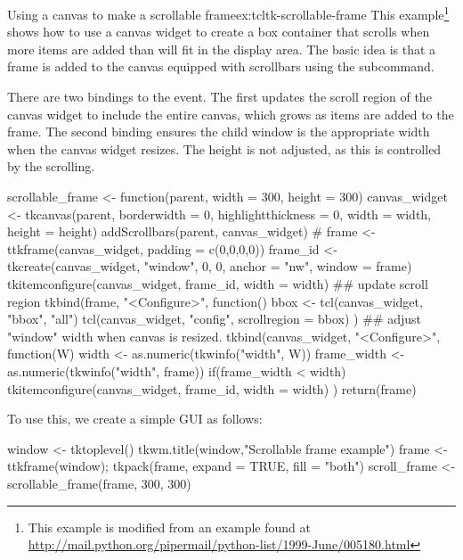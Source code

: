 \begin{example}{Using a canvas to make a scrollable frame}{ex:tcltk-scrollable-frame}
This example\footnote{This example is modified from an example found
  at \url{
    http://mail.python.org/pipermail/python-list/1999-June/005180.html}}
shows how to use a canvas widget to create a box container that
scrolls when more items are added than will fit in the display
area. The basic idea is that a frame is added to the canvas equipped
with scrollbars using the 
subcommand. 

There are two bindings to the  event. The first
updates the scroll region of the canvas widget to include the entire
canvas, which grows as items are added to the frame. The second
binding ensures the child window is the appropriate width when the
canvas widget resizes. The height is not adjusted, as this is
controlled by the scrolling.

\begin{Schunk}
\begin{Sinput}
 scrollable_frame <- function(parent, width =  300, height = 300) {
   canvas_widget <- 
     tkcanvas(parent,
              borderwidth = 0, highlightthickness = 0,
              width = width, height = height)
   addScrollbars(parent, canvas_widget)
   #
   frame <- ttkframe(canvas_widget, padding = c(0,0,0,0))
   frame_id <- tkcreate(canvas_widget, "window", 0, 0, 
                        anchor = "nw", window = frame)
   tkitemconfigure(canvas_widget, frame_id, width = width)
   ## update scroll region
   tkbind(frame, "<Configure>", function() {  
     bbox <- tcl(canvas_widget, "bbox", "all")
     tcl(canvas_widget, "config", scrollregion = bbox)
   })
   ## adjust "window" width when canvas is resized.
   tkbind(canvas_widget, "<Configure>", function(W) {
     width <- as.numeric(tkwinfo("width", W))
     frame_width <- as.numeric(tkwinfo("width", frame))
     if(frame_width < width)
       tkitemconfigure(canvas_widget, frame_id, width = width)
   })
   return(frame)
 }
\end{Sinput}
\end{Schunk}

To use this, we create a simple GUI as follows:
\begin{Schunk}
\begin{Sinput}
 window <- tktoplevel()
 tkwm.title(window,"Scrollable frame example")
 frame <- ttkframe(window); tkpack(frame, expand = TRUE, fill = "both")
 scroll_frame <- scrollable_frame(frame, 300, 300)
\end{Sinput}
\end{Schunk}


\end{example}
